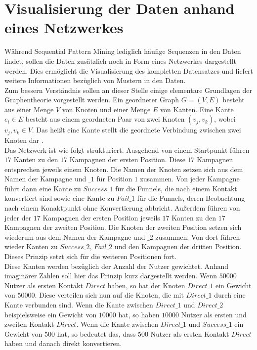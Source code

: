 \section{Visualisierung der Daten anhand eines Netzwerkes}\label{network}

Während Sequential Pattern Mining lediglich häufige Sequenzen in den Daten findet, sollen die Daten zusätzlich noch in Form eines Netzwerkes dargestellt werden. Dies ermöglicht die Visualisierung des kompletten Datensatzes und liefert weitere Informationen bezüglich von Mustern in den Daten.\\
Zum bessern Verständnis sollen an dieser Stelle einige elementare Grundlagen der Graphentheorie vorgestellt werden. Ein geordneter Graph $G=(V,E)$ besteht aus einer Menge $V$ von Knoten und einer Menge $E$ von Kanten. Eine Kante $e_i \in E$ besteht aus einem geordneten Paar von zwei Knoten $(v_j,v_k)$, wobei $v_j,v_k \in V$. Das heißt eine Kante stellt die geordnete Verbindung zwischen zwei Knoten dar \cite[16]{network_data}.\\
Das Netzwerk ist wie folgt strukturiert. Ausgehend von einem Startpunkt führen $17$ Kanten zu den $17$ Kampagnen der ersten Position. Diese $17$ Kampagnen entsprechen jeweils einem Knoten. Die Namen der Knoten setzen sich aus dem Namen der Kampagne und $\_1$ für Position $1$ zusammen. Von jeder Kampagne führt dann eine Kante zu $Success\_1$ für die Funnels, die nach einem Kontakt konvertiert sind sowie eine Kante zu $Fail\_1$ für die Funnels, deren Beobachtung nach einem Konaktpunkt ohne Konvertierung abbricht. Außerdem führen von jeder der $17$ Kampagnen der ersten Position jeweils $17$ Kanten zu den $17$ Kampagnen der zweiten Position. Die Knoten der zweiten Position setzen sich wiederum aus dem Namen der Kampagne und $\_2$ zusammen. Von dort führen wieder Kanten zu $Success\_2$, $Fail\_2$ und den Kampagnen der dritten Position. Dieses Prinzip setzt sich für die weiteren Positionen fort.\\
Diese Kanten werden bezüglich der Anzahl der Nutzer gewichtet. Anhand imaginärer Zahlen soll hier das Prinzip kurz dargestellt werden. Wenn $50000$ Nutzer als ersten Kontakt $Direct$ haben, so hat der Knoten $Direct\_1$ ein Gewicht von $50000$. Diese verteilen sich nun auf die Knoten, die mit $Direct\_1$ durch eine Kante verbunden sind. Wenn die Kante zwischen $Direct\_1$ und $Direct\_2$ beispielsweise ein Gewicht von $10000$ hat, so haben $10000$ Nutzer als ersten und zweiten Kontakt $Direct$. Wenn die Kante zwischen $Direct\_1$ und $Success\_1$ ein Gewicht von $500$ hat, so bedeutet das, dass $500$ Nutzer als ersten Kontakt $Direct$ haben und danach direkt konvertieren.\\
